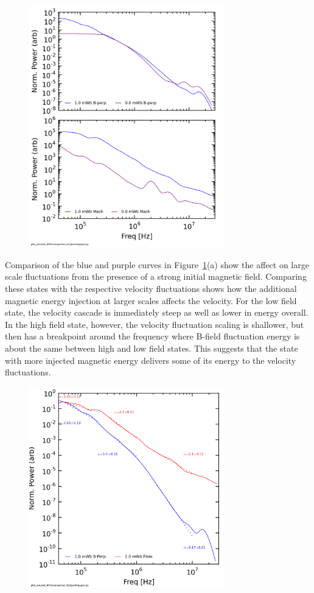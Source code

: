 \documentclass[aip,prl,amsmath,amssymb,reprint,superscriptaddress]{revtex4-1} %
\begin{document}
\begin{figure}[!htbp]
\centerline{
\includegraphics[width=8.5cm]{BvsFlowspec_2fluxes_separateplots_40t60us}}
\caption{\label{fig:BvsFlow}}
\end{figure}

Comparison of the blue and purple curves in Figure~\ref{fig:BvsFlow}(a) show the affect on large scale fluctuations from the presence of a strong initial magnetic field. Comparing these states with the respective velocity fluctuations shows how the additional magnetic energy injection at larger scales affects the velocity. For the low field state, the velocity cascade is immediately steep as well as lower in energy overall. In the high field state, however, the velocity fluctuation scaling is shallower, but then has a breakpoint around the frequency where B-field fluctuation energy is about the same between high and low field states. This suggests that the state with more injected magnetic energy delivers some of its energy to the velocity fluctuations.

\begin{figure}[!htbp]
\centerline{
\includegraphics[width=8.5cm]{BvsFlowspec_wFits_40t60us}}
\caption{\label{fig:BvsFlow_wFits}}
\end{figure}
\end{document}
